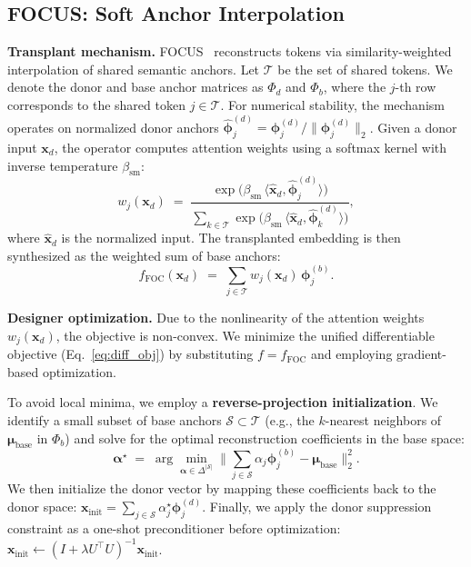 \documentclass{article}
\theoremstyle{plain}
\theoremstyle{definition}
\theoremstyle{remark}
\begin{document}
\subsection{FOCUS: Soft Anchor Interpolation}
\label{sec:focus-breaker}

\noindent\textbf{Transplant mechanism.}
FOCUS~\citep{dobler2023focus} reconstructs tokens via similarity-weighted interpolation of shared semantic anchors.
Let $\mathcal{T}$ be the set of shared tokens. We denote the donor and base anchor matrices as $\Phi_d$ and $\Phi_b$, where the $j$-th row corresponds to the shared token $j \in \mathcal{T}$.
For numerical stability, the mechanism operates on normalized donor anchors $\widehat{\boldsymbol{\phi}}^{(d)}_j = \boldsymbol{\phi}^{(d)}_j / \|\boldsymbol{\phi}^{(d)}_j\|_2$.
Given a donor input $\mathbf{x}_d$, the operator computes attention weights using a softmax kernel with inverse temperature $\beta_{\mathrm{sm}}$:
\begin{equation}
\label{eq:focus_w}
w_j(\mathbf{x}_d)
\;=\;
\frac{\exp\!\big(\beta_{\mathrm{sm}}\,\langle \widehat{\mathbf{x}}_d, \widehat{\boldsymbol{\phi}}^{(d)}_j\rangle\big)}
{\sum_{k\in\mathcal{T}} \exp\!\big(\beta_{\mathrm{sm}}\,\langle \widehat{\mathbf{x}}_d, \widehat{\boldsymbol{\phi}}^{(d)}_k\rangle\big)},
\end{equation}
where $\widehat{\mathbf{x}}_d$ is the normalized input. The transplanted embedding is then synthesized as the weighted sum of base anchors:
\begin{equation}
\label{eq:focus_func}
f_{\text{FOC}}(\mathbf{x}_d)
\;=\;
\sum_{j\in\mathcal{T}} w_j(\mathbf{x}_d)\,\boldsymbol{\phi}^{(b)}_j.
\end{equation}

\noindent\textbf{Designer optimization.}
Due to the nonlinearity of the attention weights $w_j(\mathbf{x}_d)$, the objective is non-convex.
We minimize the unified differentiable objective (Eq.~\ref{eq:diff_obj}) by substituting $f=f_{\text{FOC}}$ and employing gradient-based optimization.

To avoid local minima, we employ a \textbf{reverse-projection initialization}. We identify a small subset of base anchors $\mathcal{S}\subset\mathcal{T}$ (e.g., the $k$-nearest neighbors of $\boldsymbol{\mu}_{\text{base}}$ in $\Phi_b$) and solve for the optimal reconstruction coefficients in the base space:
\begin{equation}
\label{eq:focus_init_ls}
\boldsymbol{\alpha}^\star
\;=\;
\arg\min_{\boldsymbol{\alpha}\in\Delta^{|\mathcal{S}|}}
\Big\|\sum_{j\in\mathcal{S}} \alpha_j \boldsymbol{\phi}^{(b)}_j - \boldsymbol{\mu}_{\text{base}}\Big\|_2^2.
\end{equation}
We then initialize the donor vector by mapping these coefficients back to the donor space: $\mathbf{x}_{\text{init}} = \sum_{j\in\mathcal{S}} \alpha^\star_j \boldsymbol{\phi}^{(d)}_j$.
Finally, we apply the donor suppression constraint as a one-shot preconditioner before optimization: $\mathbf{x}_{\text{init}} \leftarrow (I+\lambda U^\top U)^{-1}\mathbf{x}_{\text{init}}$.
\end{document}
